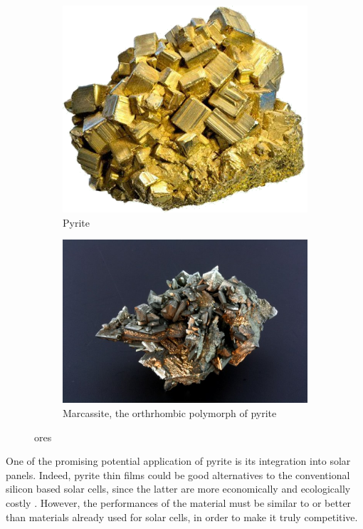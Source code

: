 \documentclass[11pt,a4paper]{article}
\begin{document}
\begin{figure}[H]
\centering
\begin{subfigure}[b]{0.45\textwidth}
\centering
\includegraphics[width=\textwidth]{images/pyrite}
\caption{Pyrite}
\label{fig:pyriteOre}
\end{subfigure}
\hfill
\begin{subfigure}[b]{0.45\textwidth}
\centering
\includegraphics[width=\textwidth]{images/marcassite}
\caption{Marcassite, the orthrhombic polymorph of pyrite}
\label{fig:marcassiteOre}
\end{subfigure}
\caption{ ores}
\end{figure}

One of the promising potential application of pyrite is its integration into solar panels. Indeed, pyrite thin films could be good alternatives to the conventional silicon based solar cells, since the latter are more economically and ecologically costly \cite{pyriteSolarCells,Ore}. However, the performances of the material must be similar to or better than materials already used for solar cells, in order to make it truly competitive.
\end{document}
